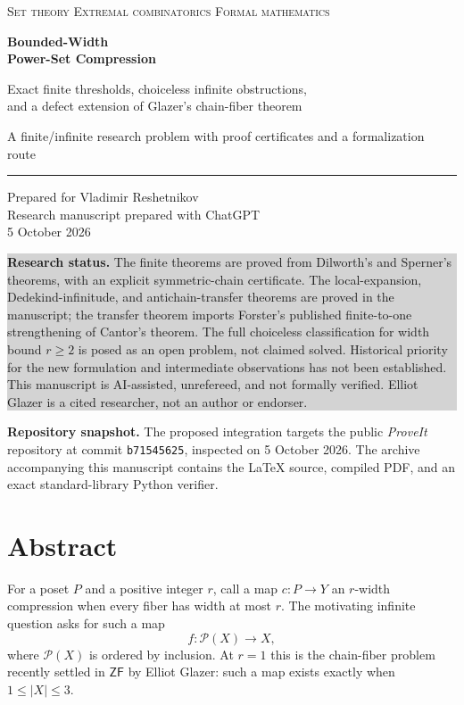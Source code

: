 \documentclass[11pt,letterpaper]{article}
\numberwithin{equation}{section}
\theoremstyle{plain}
\theoremstyle{definition}
\theoremstyle{remark}
\newcommand{\Pow}{\mathcal P}
\newcommand{\ZF}{\mathsf{ZF}}
\newcommand{\status}[1]{\par\noindent\colorbox{lightgray}{\parbox{\dimexpr\linewidth-2\fboxsep\relax}{#1}}\par}
\begin{document}
\hypersetup{pageanchor=false}
\begin{titlepage}
\color{ink}
\noindent\textsc{Set theory \;\textbar\; Extremal combinatorics \;\textbar\; Formal mathematics}
\vspace{0.85in}
\begin{flushleft}
{\Huge\bfseries Bounded-Width\\[5pt] Power-Set Compression}\par
\vspace{0.22in}
{\Large Exact finite thresholds, choiceless infinite obstructions,\\[3pt]
and a defect extension of Glazer's chain-fiber theorem}\par
\vspace{0.28in}
{\large A finite/infinite research problem with proof certificates and a formalization route}\par
\end{flushleft}
\vspace{0.30in}
\noindent\rule{\linewidth}{0.7pt}
\vspace{0.18in}
\noindent Prepared for Vladimir Reshetnikov\\
Research manuscript prepared with ChatGPT\\
5 October 2026
\vfill
\status{\textbf{Research status.} The finite theorems are proved from Dilworth's and Sperner's theorems, with an explicit symmetric-chain certificate. The local-expansion, Dedekind-infinitude, and antichain-transfer theorems are proved in the manuscript; the transfer theorem imports Forster's published finite-to-one strengthening of Cantor's theorem. The full choiceless classification for width bound $r\geq2$ is posed as an open problem, not claimed solved. Historical priority for the new formulation and intermediate observations has not been established. This manuscript is AI-assisted, unrefereed, and not formally verified. Elliot Glazer is a cited researcher, not an author or endorser.}
\vspace{7pt}
{\footnotesize\noindent\textbf{Repository snapshot.} The proposed integration targets the public \emph{ProveIt} repository at commit \texttt{b71545625}, inspected on 5 October 2026. The archive accompanying this manuscript contains the \LaTeX{} source, compiled PDF, and an exact standard-library Python verifier.\par}
\end{titlepage}
\hypersetup{pageanchor=true}

\section*{Abstract}
For a poset $P$ and a positive integer $r$, call a map $c:P\to Y$ an
$r$-width compression when every fiber has width at most $r$.  The motivating
infinite question asks for such a map
\[
        f:\Pow(X)\longrightarrow X,
\]
where $\Pow(X)$ is ordered by inclusion.  At $r=1$ this is the chain-fiber
problem recently settled in $\ZF$ by Elliot Glazer: such a map exists exactly
when $1\leq |X|\leq3$.
\end{document}
